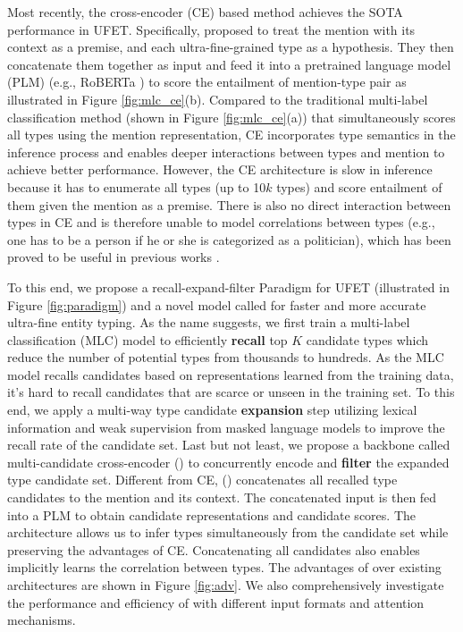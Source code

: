Most recently, the cross-encoder (CE) based method \cite{lite} achieves the SOTA performance in UFET. Specifically, \citet{lite} proposed to treat the mention with its context as a premise, and each ultra-fine-grained type as a hypothesis. They then concatenate them together as input and feed it into a pretrained language model (PLM) (e.g., RoBERTa \cite{liu2019roberta}) to score the entailment of mention-type pair as illustrated in Figure \ref{fig:mlc_ce}(b). Compared to the traditional multi-label classification method (shown in Figure \ref{fig:mlc_ce}(a)) that simultaneously scores all types using the mention representation, CE incorporates type semantics in the inference process and enables deeper interactions between types and mention to achieve better performance. However, the CE architecture is slow in inference because it has to enumerate all types (up to 10$k$ types) and score entailment of them given the mention as a premise. There is also no direct interaction between types in CE and is therefore unable to model correlations between types (e.g., one has to be a person if he or she is categorized as a politician), which has been proved to be useful in previous works \cite{npcrf, xiong-etal-2019-imposing}.

To this end, we propose a recall-expand-filter Paradigm for UFET (illustrated in Figure \ref{fig:paradigm}) and a novel model called {\bf \textsc{\name}} for faster and more accurate ultra-fine entity typing. As the name suggests, we first train a multi-label classification (MLC) model to efficiently \textbf{recall} top $K$ candidate types which reduce the number of potential types from thousands to hundreds. As the MLC model recalls candidates based on representations learned from the training data, it's hard to recall candidates that are scarce or unseen in the training set. To this end, we apply a multi-way type candidate \textbf{expansion} step utilizing lexical information and weak supervision from masked language models \cite{mlmet} to improve the recall rate of the candidate set. Last but not least, we propose a backbone called multi-candidate cross-encoder ({\bf \textsc{\name}}) to concurrently encode and \textbf{filter} the expanded type candidate set. Different from CE,  ({\bf \textsc{\name}}) concatenates all recalled type candidates to the mention and its context. The concatenated input is then fed into a PLM to obtain candidate representations and candidate scores. The {\bf \textsc{\name}} architecture allows us to infer types simultaneously from the candidate set while preserving the advantages of CE. Concatenating all candidates also enables {\bf \textsc{\name}} implicitly learns the correlation between types. The advantages of {\bf \textsc{\name}} over existing architectures are shown in Figure \ref{fig:adv}. We also comprehensively investigate the performance and efficiency of {\bf \textsc{\name}} with different input formats and attention mechanisms.

